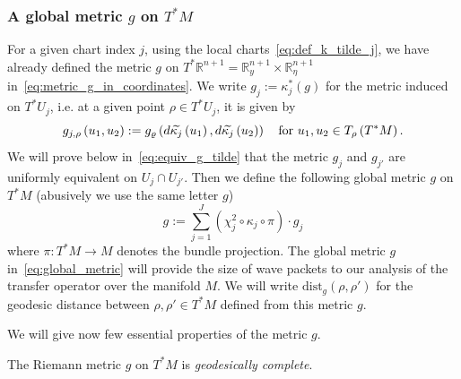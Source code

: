 \documentclass[AHL,Unicode,longabstracts,published]{cedram}
\newcommand{\dist}{\mathrm{dist}}
\newcommand{\bbR}{\mathbb{R}}
\let\oldtilde\tilde
\renewcommand*{\tilde}[1]{\mathchoice{\widetilde{#1}}{\widetilde{#1}}{\oldtilde{#1}}{\oldtilde{#1}}}
\newcommand{\bbR}{\mathbb{R}}
\begin{document}
\subsubsection{\label{subsec:A-metric}
A global metric \texorpdfstring{$g$}{g} on \texorpdfstring{$T^{*}M$}{T*M}}

For a given chart index $j$, using the local charts~\eqref{eq:def_k_tilde_j}, we have already defined the metric $g$ on $T^{*}\bbR^{n+1}=\bbR_{y}^{n+1}\times\bbR_{\eta}^{n+1}$ in~\eqref{eq:metric_g_in_coordinates}. We write $g_{j}:=\kappa_{j}^{*}(g)$ for the metric induced on $T^{*}U_{j}$, i.e. at a given point $\rho\in T^{*}U_{j}$, it is given by
\[
g_{j,\rho}\left(u_{1},u_{2}\right):=g_{\varrho}\left(d\tilde{\kappa_{j}}\left(u_{1}\right),d\tilde{\kappa_{j}}\left(u_{2}\right)\right)\quad\text{for }u_{1},u_{2}\in T_{\rho}\left(T^{*}M\right).
\]
We will prove below in~\eqref{eq:equiv_g_tilde} that the metric $g_{j}$ and $g_{j'}$ are uniformly equivalent on $U_{j}\cap U_{j'}$. Then we define the following global metric $g$ on $T^{*}M$ (abusively we use the same letter $g$)
\begin{equation}\label{eq:global_metric}
g:=\sum_{j=1}^{J}\left(\chi_{j}^{2}\circ\kappa_{j}\circ\pi\right)\cdot g_{j}
\end{equation}
where $\pi:T^{*}M\to M$ denotes the bundle projection. The global metric $g$ in~\eqref{eq:global_metric} will provide the size of wave packets to our analysis of the transfer operator over the manifold $M$. We will write $\dist_{g}(\rho,\rho')$ for the geodesic distance between $\rho,\rho'\in T^{*}M$ defined from this metric $g$.

We will give now few essential properties of the metric $g$.

\begin{cBoxB}{}
\begin{lemm}\label{thm:The-metric-}
The Riemann metric $g$ on $T^{*}M$ is \emph{geodesically complete}.
\end{lemm}
\end{cBoxB}
\end{document}
